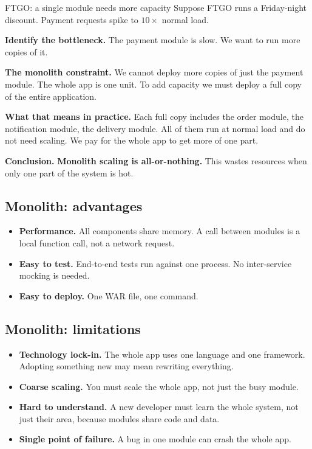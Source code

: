 \documentclass[a4paper,11pt]{article}
\begin{document}
\begin{worked}{FTGO: a single module needs more capacity}
Suppose FTGO runs a Friday-night discount.
Payment requests spike to $10\times$ normal load.
\begin{steps}
  \item \textbf{Identify the bottleneck.}
    The payment module is slow.
    We want to run more copies of it.
  \item \textbf{The monolith constraint.}
    We cannot deploy more copies of just the payment module.
    The whole app is one unit.
    To add capacity we must deploy a full copy of the entire application.
  \item \textbf{What that means in practice.}
    Each full copy includes the order module, the notification module, the delivery module.
    All of them run at normal load and do not need scaling.
    We pay for the whole app to get more of one part.
  \item \textbf{Conclusion.}
    \textbf{Monolith scaling is all-or-nothing.}
    This wastes resources when only one part of the system is hot.
\end{steps}
\end{worked}

\subsection{Monolith: advantages}

\begin{itemize}
  \item \textbf{Performance.} All components share memory.
    A call between modules is a local function call, not a network request.
  \item \textbf{Easy to test.} End-to-end tests run against one process.
    No inter-service mocking is needed.
  \item \textbf{Easy to deploy.} One WAR file, one command.
\end{itemize}

\subsection{Monolith: limitations}

\begin{itemize}
  \item \textbf{Technology lock-in.} The whole app uses one language and one framework.
    Adopting something new may mean rewriting everything.
  \item \textbf{Coarse scaling.} You must scale the whole app, not just the busy module.
  \item \textbf{Hard to understand.} A new developer must learn the whole system,
    not just their area, because modules share code and data.
  \item \textbf{Single point of failure.} A bug in one module can crash the whole app.
\end{itemize}
\end{document}
